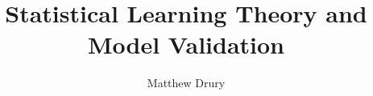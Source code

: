 \documentclass{beamer}
\title{Statistical Learning Theory and Model Validation}
\author{Matthew Drury}
\begin{document}
%
\begin{frame}
  \titlepage
\end{frame}
%

%
\end{document}
